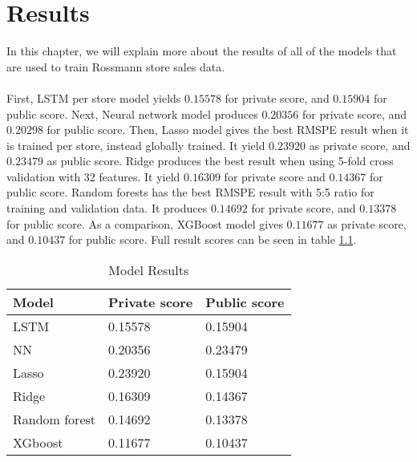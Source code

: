 \chapter{Results}
In this chapter, we will explain more about the results of all of the models that are used to train Rossmann store sales data. \\ \\
First, LSTM per store model yields $0.15578$ for private score, and $0.15904$ for public score. Next, Neural network model produces $0.20356$ for private score, and $0.20298$ for public score. Then, Lasso model gives the best RMSPE result when it is trained per store, instead globally trained. It yield $0.23920$ as private score, and $0.23479$ as public score. Ridge produces the best result when using 5-fold cross validation with 32 features. It yield $0.16309$ for private score and $0.14367$ for public score. Random forests has the best RMSPE result with 5:5 ratio for training and validation data. It produces $0.14692$ for private score, and $0.13378$ for public score. As a comparison, XGBoost model gives $0.11677$ as private score, and $0.10437$ for public score. Full result scores can be seen in table \ref{tab:result}.

\begin{table}[H]
	\centering
	\caption{Model Results}
	\label{tab:result}
	\begin{tabular}{|m{200pt}|m{100pt}|m{100pt}|}
		\hline
		Model & Private score & Public score \\ \hline
		LSTM & 0.15578 & 0.15904 \\ \hline
		NN & 0.20356 & 0.23479 \\ \hline
		Lasso & 0.23920 & 0.15904 \\ \hline
		Ridge & 0.16309 & 0.14367 \\ \hline
		Random forest & 0.14692 & 0.13378 \\ \hline
		XGboost & 0.11677 & 0.10437 \\ \hline
	\end{tabular}
\end{table}